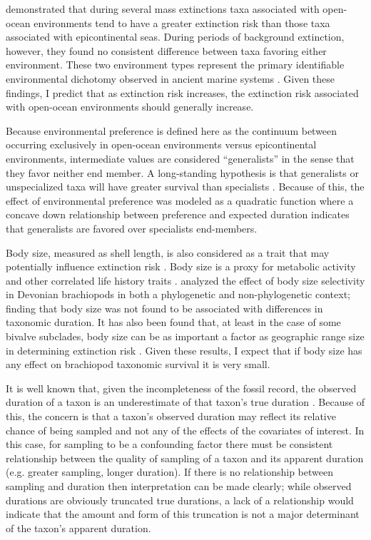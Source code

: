 \documentclass{article}
\begin{document}
\citet{Miller2009a} demonstrated that during several mass extinctions taxa associated with open-ocean environments tend to have a greater extinction risk than those taxa associated with epicontinental seas. During periods of background extinction, however, they found no consistent difference between taxa favoring either environment. These two environment types represent the primary identifiable environmental dichotomy observed in ancient marine systems \citep{Miller2009a,Peters2008,Sheehan2001b}. Given these findings, I predict that as extinction risk increases, the extinction risk associated with open-ocean environments should generally increase. 

Because environmental preference is defined here as the continuum between occurring exclusively in open-ocean environments versus epicontinental environments, intermediate values are considered ``generalists'' in the sense that they favor neither end member. A long-standing hypothesis is that generalists or unspecialized taxa will have greater survival than specialists \citep{Simpson1944,Liow2004a,Liow2007b,Nurnberg2013a,Nurnberg2015,Baumiller1993}. Because of this, the effect of environmental preference was modeled as a quadratic function where a concave down relationship between preference and expected duration indicates that generalists are favored over specialists end-members.

Body size, measured as shell length, is also considered as a trait that may potentially influence extinction risk \citep{Payne2014,Harnik2011}. Body size is a proxy for metabolic activity and other correlated life history traits \citep{Payne2014}. \citet{Harnik2014} analyzed the effect of body size selectivity in Devonian brachiopods in both a phylogenetic and non-phylogenetic context; finding that body size was not found to be associated with differences in taxonomic duration. It has also been found that, at least in the case of some bivalve subclades, body size can be as important a factor as geographic range size in determining extinction risk \citep{Harnik2011}. Given these results, I expect that if body size has any effect on brachiopod taxonomic survival it is very small.

It is well known that, given the incompleteness of the fossil record, the observed duration of a taxon is an underestimate of that taxon's true duration \citep{Solow1997,Wagner2013a,Wang2004,Liow2010b,Alroy2014a,Foote1996e}. Because of this, the concern is that a taxon's observed duration may reflect its relative chance of being sampled and not any of the effects of the covariates of interest. In this case, for sampling to be a confounding factor there must be consistent relationship between the quality of sampling of a taxon and its apparent duration (e.g. greater sampling, longer duration). If there is no relationship between sampling and duration then interpretation can be made clearly; while observed durations are obviously truncated true durations, a lack of a relationship would indicate that the amount and form of this truncation is not a major determinant of the taxon's apparent duration.
\end{document}
